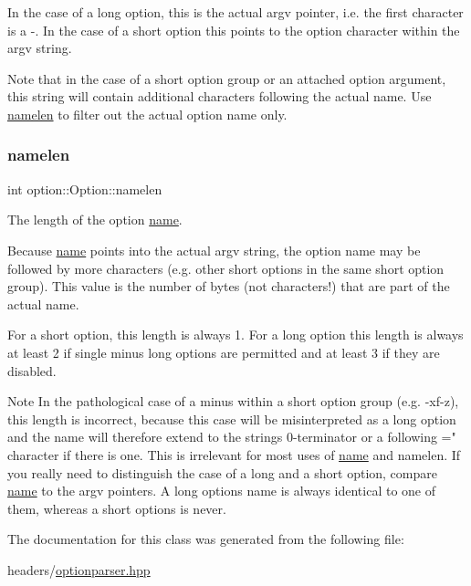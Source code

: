 In the case of a long option, this is the actual {\ttfamily argv} pointer, i.\+e. the first character is a \textquotesingle{}-\/\textquotesingle{}. In the case of a short option this points to the option character within the {\ttfamily argv} string.

Note that in the case of a short option group or an attached option argument, this string will contain additional characters following the actual name. Use \hyperlink{classoption_1_1Option_a3aa2957b19ad5815873441b415d56050}{namelen} to filter out the actual option name only. \mbox{\label{classoption_1_1Option_a3aa2957b19ad5815873441b415d56050}} 
\subsubsection{\texorpdfstring{namelen}{namelen}}
{\footnotesize\ttfamily int option\+::\+Option\+::namelen}



The length of the option \hyperlink{classoption_1_1Option_a02a76b4896abd22d0ba8514362261de9}{name}. 

Because \hyperlink{classoption_1_1Option_a02a76b4896abd22d0ba8514362261de9}{name} points into the actual {\ttfamily argv} string, the option name may be followed by more characters (e.\+g. other short options in the same short option group). This value is the number of bytes (not characters!) that are part of the actual name.

For a short option, this length is always 1. For a long option this length is always at least 2 if single minus long options are permitted and at least 3 if they are disabled.

\begin{DoxyNote}{Note}
In the pathological case of a minus within a short option group (e.\+g. {\ttfamily -\/xf-\/z}), this length is incorrect, because this case will be misinterpreted as a long option and the name will therefore extend to the string\textquotesingle{}s 0-\/terminator or a following \textquotesingle{}=" character if there is one. This is irrelevant for most uses of \hyperlink{classoption_1_1Option_a02a76b4896abd22d0ba8514362261de9}{name} and {\ttfamily namelen}. If you really need to distinguish the case of a long and a short option, compare \hyperlink{classoption_1_1Option_a02a76b4896abd22d0ba8514362261de9}{name} to the {\ttfamily argv} pointers. A long option\textquotesingle{}s {\ttfamily name} is always identical to one of them, whereas a short option\textquotesingle{}s is never. 
\end{DoxyNote}


The documentation for this class was generated from the following file\+:\begin{DoxyCompactItemize}
\item 
headers/\hyperlink{optionparser_8hpp}{optionparser.\+hpp}\end{DoxyCompactItemize}

